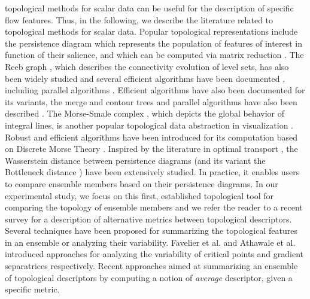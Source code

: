 topological methods for scalar data can be useful for the description of
specific flow features. Thus, in the following, we describe the literature
related to topological methods for scalar data.
Popular topological representations include the persistence diagram
\cite{edelsbrunner02, edelsbrunner09}
which represents the
population of features of interest in function of their salience, and which
can be computed via matrix reduction
\cite{edelsbrunner09, dipha}. The Reeb graph \cite{biasotti08}, which describes
the connectivity evolution of level sets, has also been widely studied and
several efficient algorithms have been documented \cite{pascucci07,
tierny_vis09, parsa12, DoraiswamyN13}, including parallel algorithms
\cite{gueunet_egpgv19}.
Efficient algorithms have also been documented for its variants,
the
merge and contour trees \cite{tarasov98, carr00}
and parallel algorithms have
also been described \cite{MaadasamyDN12, AcharyaN15,
CarrWSA16, gueunet_tpds19}. The Morse-Smale complex \cite{EdelsbrunnerHZ01,
EdelsbrunnerHNP03,
BremerEHP03}, which depicts the
global behavior of integral lines, is another popular topological data
abstraction in visualization \cite{Defl15}. Robust and efficient algorithms
have been introduced for its computation  \cite{robins_pami11, ShivashankarN12,
gyulassy_vis18} based on Discrete Morse Theory \cite{forman98}.
Inspired by the literature in
optimal transport \cite{Kantorovich, monge81}, the Wasserstein distance between
persistence diagrams \cite{edelsbrunner09}
(and its variant the
Bottleneck distance \cite{edelsbrunner02}) have been extensively studied.
In
practice, it enables users to compare ensemble members based on their
persistence diagrams.
In our experimental study, we focus on this first, established topological tool
for comparing the topology of ensemble members and we refer the reader to a
recent survey \cite{YanMSRNHW21} for a description of alternative metrics
between topological descriptors.
Several techniques have been proposed for summarizing the topological features
in an ensemble or analyzing their variability.
Favelier et al.
\cite{favelier2018} and Athawale et al. \cite{athawale_tvcg19} introduced
approaches for analyzing the variability of critical points and
gradient separatrices respectively. Recent approaches aimed at summarizing
an ensemble of topological descriptors by computing a notion of \emph{average}
descriptor,
given a specific metric.
